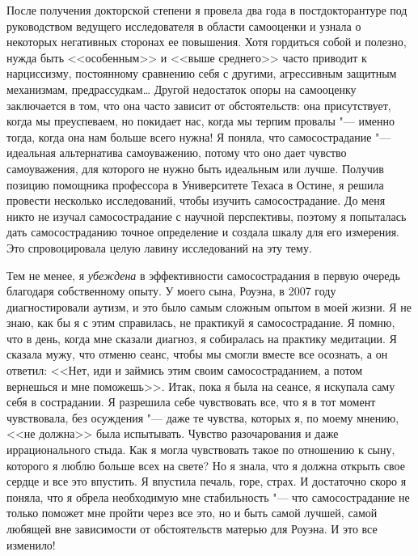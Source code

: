 	После получения докторской степени я провела два года в постдокторантуре под руководством ведущего исследователя в области самооценки и узнала о некоторых негативных сторонах ее повышения. Хотя гордиться собой и полезно, нужда быть <<особенным>> и <<выше среднего>> часто приводит к нарциссизму, постоянному сравнению себя с другими, агрессивным защитным механизмам, предрассудкам… Другой недостаток опоры на самооценку заключается в том, что она часто зависит от обстоятельств: она присутствует, когда мы преуспеваем, но покидает нас, когда мы терпим провалы "--- именно тогда, когда она нам больше всего нужна! Я поняла, что самосострадание "--- идеальная альтернатива самоуважению, потому что оно дает чувство самоуважения, для которого не нужно быть идеальным или лучше. Получив позицию помощника профессора в Университете Техаса в Остине, я решила провести несколько исследований, чтобы изучить самосострадание. До меня никто не изучал самосострадание с научной перспективы, поэтому я попыталась дать самосостраданию точное определение и создала шкалу для его измерения. Это спровоцировала целую лавину исследований на эту тему.  
	
	Тем не менее, я \emph{убеждена} в эффективности самосострадания в первую очередь благодаря собственному опыту. У моего сына, Роуэна, в 2007 году диагностировали аутизм, и это было самым сложным опытом в моей жизни. Я не знаю, как бы я с этим справилась, не практикуй я самосострадание. Я помню, что в день, когда мне сказали диагноз, я собиралась на практику медитации. Я сказала мужу, что отменю сеанс, чтобы мы смогли вместе все осознать, а он ответил: <<Нет, иди и займись этим своим самосостраданием, а потом вернешься и мне поможешь>>. Итак, пока я была на сеансе, я искупала саму себя в сострадании. Я разрешила себе чувствовать все, что я в тот момент чувствовала, без осуждения "--- даже те чувства, которых я, по моему мнению, <<не должна>> была испытывать. Чувство разочарования и даже иррационального стыда. Как я могла чувствовать такое по отношению к сыну, которого я люблю больше всех на свете? Но я знала, что я должна открыть свое сердце и все это впустить. Я впустила печаль, горе, страх. И достаточно скоро я поняла, что я обрела необходимую мне стабильность "--- что самосострадание не только поможет мне пройти через все это, но и быть самой лучшей, самой любящей вне зависимости от обстоятельств матерью для Роуэна. И это все изменило!
	
